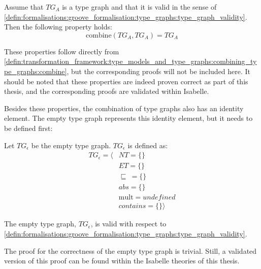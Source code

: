 \begin{thm}
\label{defin:transformation_framework:type_models_and_type_graphs:combining_type_graphs:tg_combine_idemp}
Assume that $TG_A$ is a type graph and that it is valid in the sense of \cref{defin:formalisations:groove_formalisation:type_graphs:type_graph_validity}. Then the following property holds:
\begin{equation*}
    \mathrm{combine}(TG_A, TG_A) = TG_A
\end{equation*}
\end{thm}

These properties follow directly from \cref{defin:transformation_framework:type_models_and_type_graphs:combining_type_graphs:combine}, but the corresponding proofs will not be included here. It should be noted that these properties are indeed proven correct as part of this thesis, and the corresponding proofs are validated within Isabelle.

Besides these properties, the combination of type graphs also has an identity element. The empty type graph represents this identity element, but it needs to be defined first:

\begin{defin}
\label{defin:transformation_framework:type_models_and_type_graphs:combining_type_graphs:empty_type_graph}
Let $TG_{\epsilon}$ be the empty type graph. $TG_{\epsilon}$ is defined as:
\begin{align*}
TG_{\epsilon} = \langle&
NT = \{\} \\&
ET = \{\} \\&
\!\!\sqsubseteq\ = \{\} \\&
abs = \{\} \\&
\mathrm{mult} = undefined \\&
contains = \{\} \rangle
\end{align*}
\end{defin}

\begin{thm}
\label{defin:transformation_framework:type_models_and_type_graphs:combining_type_graphs:tg_empty_correct}
The empty type graph, $TG_{\epsilon}$, is valid with respect to
\cref{defin:formalisations:groove_formalisation:type_graphs:type_graph_validity}.
\end{thm}

The proof for the correctness of the empty type graph is trivial. Still, a validated version of this proof can be found within the Isabelle theories of this thesis.

